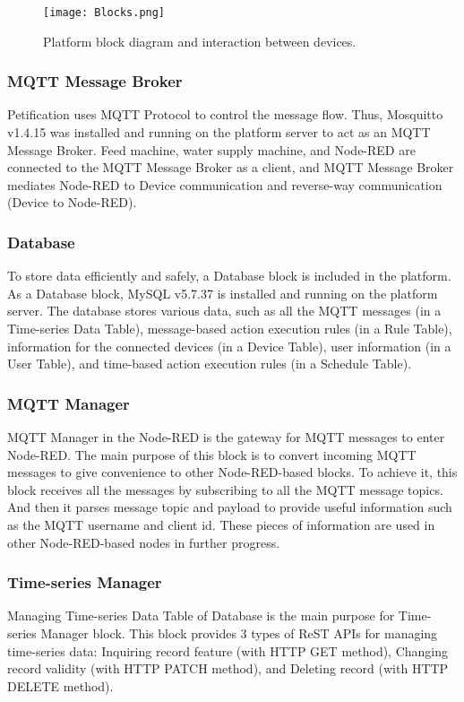 \documentclass[conference]{IEEEtran}
\begin{document}
\begin{figure}[htbp]
\centerline{\texttt{[image: Blocks.png]}}
\caption{Platform block diagram and interaction between devices.}
\label{fig}
\end{figure}

\subsubsection{MQTT Message Broker}
\hfill \break Petification uses MQTT Protocol to control the message flow. Thus, Mosquitto v1.4.15 was installed and running on the platform server to act as an MQTT Message Broker. Feed machine, water supply machine, and Node-RED are connected to the MQTT Message Broker as a client, and MQTT Message Broker mediates Node-RED to Device communication and reverse-way communication (Device to Node-RED).

\subsubsection{Database}
\hfill \break To store data efficiently and safely, a Database block is included in the platform. As a Database block, MySQL v5.7.37 is installed and running on the platform server. The database stores various data, such as all the MQTT messages (in a Time-series Data Table), message-based action execution rules (in a Rule Table), information for the connected devices (in a Device Table), user information (in a User Table), and time-based action execution rules (in a Schedule Table).

\subsubsection{MQTT Manager}
\hfill \break MQTT Manager in the Node-RED is the gateway for MQTT messages to enter Node-RED. The main purpose of this block is to convert incoming MQTT messages to give convenience to other Node-RED-based blocks. To achieve it, this block receives all the messages by subscribing to all the MQTT message topics. And then it parses message topic and payload to provide useful information such as the MQTT username and client id. These pieces of information are used in other Node-RED-based nodes in further progress.

\subsubsection{Time-series Manager}
\hfill \break Managing Time-series Data Table of Database is the main purpose for Time-series Manager block. This block provides 3 types of ReST APIs for managing time-series data: Inquiring record feature (with HTTP GET method), Changing record validity (with HTTP PATCH method), and Deleting record (with HTTP DELETE method). 
\end{document}

